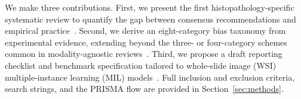 We make three contributions. First, we present the first histopathology-specific systematic review to quantify the gap between consensus recommendations and empirical practice~\citep{riccilara2022addressing, chen2023algorithmic, montezuma2025unbiased}. Second, we derive an eight-category bias taxonomy from experimental evidence, extending beyond the three- or four-category schemes common in modality-agnostic reviews~\citep{tasci2022bias, yang2024survey, howard2021site, dehkharghanian2023biased, vaidya2024demographic}. Third, we propose a draft reporting checklist and benchmark specification tailored to whole-slide image (WSI) multiple-instance learning (MIL) models~\citep{zong2023medfair, koh2021wilds, komen2024batch, huang2025knowledge}. Full inclusion and exclusion criteria, search strings, and the PRISMA flow are provided in Section~\ref{sec:methods}.
